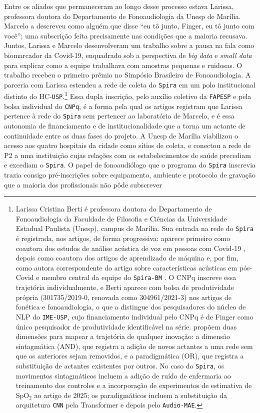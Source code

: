 Entre os aliados que permaneceram ao longo desse processo estava Larissa, professora doutora do Departamento de Fonoaudiologia da Unesp de Marília. Marcelo a descreveu como alguém que disse \enquote{eu tô junto, Finger, eu tô junto com você}; uma subscrição \parencite{AkrichLatour1992Convenient} feita precisamente nas condições que a maioria recusava. Juntos, Larissa e Marcelo desenvolveram um trabalho sobre a pausa na fala como biomarcador da Covid-19, enquadrado sob a perspectiva de \textit{big data} e \textit{small data} para explicar como a equipe trabalhava com amostras pequenas e ruidosas. O trabalho recebeu o primeiro prêmio no Simpósio Brasileiro de Fonoaudiologia. A parceria com Larissa estendeu a rede de coleta do \texttt{Spira} em um polo institucional distinto do HC-\texttt{USP}.\footnote{Larissa Cristina Berti é professora doutora do Departamento de Fonoaudiologia da Faculdade de Filosofia e Ciências da Universidade Estadual Paulista (Unesp), campus de Marília. Sua entrada na rede do \texttt{Spira} é registrada, nos artigos, de forma progressiva: aparece primeiro como coautora dos estudos de análise acústica de voz em pessoas com Covid-19 \parencite{Svartman2022Temporal,Berti2023Frequency}, depois como coautora dos artigos de aprendizado de máquina \parencite{Gauy2024Discriminant} e, por fim, como autora correspondente do artigo sobre características acústicas em pós-Covid \parencite{Berti2025Healthcare} e membro central da equipe do \texttt{Spira-BM} \parencite{Finger2025SPIRABM}. O CNPq inscreve essa trajetória individualmente, e Berti aparece com bolsa de produtividade própria (301735/2019-0, renovada como 304961/2021-3) nos artigos de fonética e fonoaudiologia, o que a distingue dos pesquisadores do núcleo de NLP do \texttt{IME-USP}, cujo financiamento individual pelo CNPq é de Finger como único pesquisador de produtividade identificável na série. \textcite{LatourMauguinTeil1992} propõem duas dimensões para mapear a trajetória de qualquer inovação: a dimensão sintagmática (AND), que registra a adição de novos actantes a uma rede sem que os anteriores sejam removidos, e a paradigmática (OR), que registra a substituição de actantes existentes por outros. No caso do \texttt{Spira}, os movimentos sintagmáticos incluem a adição de ruído de enfermaria ao treinamento dos controles e a incorporação de experimentos de estimativa de SpO$_2$ ao artigo de 2025; os paradigmáticos incluem a substituição da arquitetura \texttt{CNN} pela Transformer e depois pelo \texttt{\texttt{Audio-MAE}}.} Essa dupla inscrição, pelo auxílio coletivo da \texttt{FAPESP} e pela bolsa individual do \texttt{CNPq}, é a forma pela qual os artigos registram que Larissa pertence à rede do \texttt{Spira} sem pertencer ao laboratório de Marcelo, e é essa autonomia de financiamento e de institucionalidade que a torna um actante de continuidade entre as duas fases do projeto. A Unesp de Marília viabilizou o acesso aos quatro hospitais da cidade como sítios de coleta, e conectou a rede de P2 a uma instituição cujas relações com os estabelecimentos de saúde precediam e excediam o \texttt{Spira}. O papel de fonoaudiólogo que o programa do \texttt{Spira} inscrevia trazia consigo pré-inscrições sobre equipamento, ambiente e protocolo de gravação que a maioria dos profissionais não pôde subscrever 